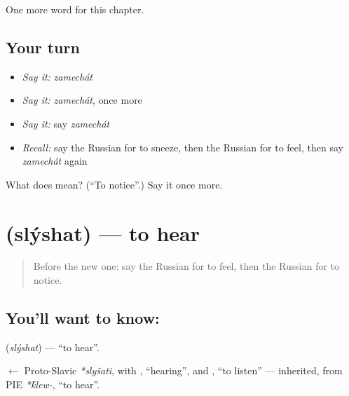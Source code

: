 \begin{grammarlens}[title={What you've built}]
One more word for this chapter.
\end{grammarlens}

\subsection*{Your turn}
\begin{itemize}
\raggedright
  \item \emph{Say it:} \emph{zamechát}
  \item \emph{Say it:} \emph{zamechát}, once more
  \item \emph{Say it:} say \emph{zamechát}
  \item \emph{Recall:} say the Russian for to sneeze, then the Russian for to feel, then say \emph{zamechát} again
\end{itemize}

\begin{tcolorbox}[breakable,colback=teal!4,colframe=teal!35!black,title={Before you move on}]
What does  mean? (\textquotedblleft{}To notice\textquotedblright{}.) Say it once more.
\end{tcolorbox}
\section[\texorpdfstring{\ru{слышать} (slýshat)}{слышать (slýshat)}]{ (slýshat) — to hear}

\label{lesson:RU-C208-slyshat}



\begin{quote}
Before the new one: say the Russian for to feel, then the Russian for to notice.
\end{quote}

\subsection*{You'll want to know: }
\textbf{} (\emph{slýshat}) — \textquotedblleft{}to hear\textquotedblright{}.

\begin{cousinweb}
\textbf{} $\leftarrow$ Proto-Slavic \emph{*slyšati}, with \emph{}, \textquotedblleft{}hearing\textquotedblright{}, and \emph{}, \textquotedblleft{}to listen\textquotedblright{} — inherited, from PIE \emph{*\'{k}lew-}, \textquotedblleft{}to hear\textquotedblright{}.
\end{cousinweb}


